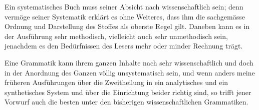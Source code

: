 \label{fp.115}

Ein systematisches Buch muss seiner Absicht nach wissenschaftlich sein; denn vermöge seiner Systematik erklärt es ohne Weiteres, dass ihm die sachgemässe Ordnung und Darstellung des Stoffes als oberste Regel gilt. Daneben kann es in der Ausführung sehr methodisch, vielleicht auch sehr unmethodisch sein, jenachdem es den Bedürfnissen des Lesers mehr oder minder Rechnung trägt.

\label{sp.110}


Eine Grammatik kann ihrem ganzen Inhalte nach sehr wissenschaftlich und doch in der Anordnung des Ganzen völlig unsystematisch sein, und wenn anders meine früheren Ausführungen über die Zweitheilung in ein analytisches und ein synthetisches System und über die Einrichtung beider richtig sind, so trifft jener Vorwurf auch die besten unter den bisherigen wissenschaftlichen Grammatiken.

